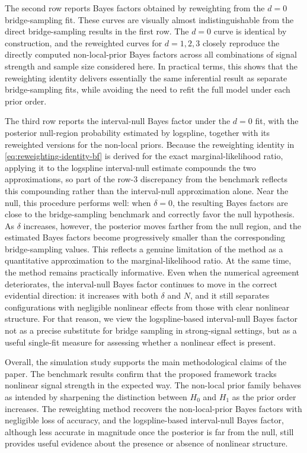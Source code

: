 \documentclass{article}
\begin{document}
The second row reports Bayes factors obtained by reweighting from the
$d=0$ bridge-sampling fit. These curves are visually almost
indistinguishable from the direct bridge-sampling results in the first
row. The $d=0$ curve is identical by construction, and the reweighted
curves for $d=1,2,3$ closely reproduce the directly computed
non-local-prior Bayes factors across all combinations of signal strength
and sample size considered here. In practical terms, this shows that the
reweighting identity delivers essentially the same inferential result as
separate bridge-sampling fits, while avoiding the need to refit the full
model under each prior order.

The third row reports the interval-null Bayes factor under the $d=0$
fit, with the posterior null-region probability estimated by logspline,
together with its reweighted versions for the non-local priors. Because
the reweighting identity in \eqref{eq:reweighting-identity-bf} is
derived for the exact marginal-likelihood ratio, applying it to the
logspline interval-null estimate compounds the two approximations, so
part of the row-3 discrepancy from the benchmark reflects this
compounding rather than the interval-null approximation alone. Near the
null, this procedure performs well: when $\delta=0$, the resulting Bayes
factors are close to the bridge-sampling benchmark and correctly favor
the null hypothesis. As $\delta$ increases, however, the posterior moves
farther from the null region, and the estimated Bayes factors become
progressively smaller than the corresponding bridge-sampling values.
This reflects a genuine limitation of the method as a quantitative
approximation to the marginal-likelihood ratio. At the same time, the
method remains practically informative. Even when the numerical
agreement deteriorates, the interval-null Bayes factor continues to move
in the correct evidential direction: it increases with both $\delta$ and
$N$, and it still separates configurations with negligible nonlinear
effects from those with clear nonlinear structure. For that reason, we
view the logspline-based interval-null Bayes factor not as a precise
substitute for bridge sampling in strong-signal settings, but as a
useful single-fit measure for assessing whether a nonlinear effect is
present.

Overall, the simulation study supports the main methodological claims of
the paper. The benchmark results confirm that the proposed framework
tracks nonlinear signal strength in the expected way. The non-local
prior family behaves as intended by sharpening the distinction between
$H_0$ and $H_1$ as the prior order increases. The reweighting method
recovers the non-local-prior Bayes factors with negligible loss of
accuracy, and the logspline-based interval-null Bayes factor, although
less accurate in magnitude once the posterior is far from the null,
still provides useful evidence about the presence or absence of
nonlinear structure.
\end{document}
